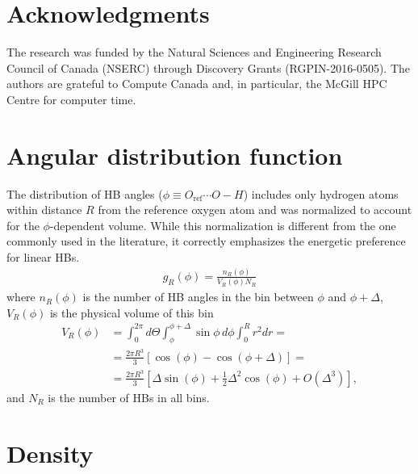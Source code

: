 \documentclass[10pt,amsmath,twocolumn,aps,prl,superscriptaddress,floatfix]{revtex4-1}
\newcommand{\bea}{\begin{eqnarray}}
\newcommand{\eea}{\end{eqnarray}}
\def\nn{\nonumber\\}
\begin{document}
\section{Acknowledgments} 

The research was funded by the Natural Sciences and Engineering Research Council of Canada (NSERC) through Discovery
Grants (RGPIN-2016-0505). The authors are grateful to Compute Canada and, in particular, the McGill HPC Centre for computer time.

\else %
\maketitle
\setcounter{figure}{0}
\renewcommand{\thefigure}{S\arabic{figure}}
\renewcommand{\thepage}{S\arabic{page}}
\section{Angular distribution function} 

The distribution of HB angles ($\phi \equiv O_{\text{ref}} \cdots O-H$) includes only hydrogen atoms within distance $R$ from the reference oxygen atom and was normalized to account for the $\phi$-dependent volume. While this normalization is different from the one commonly used in the literature, it correctly emphasizes the energetic preference for linear HBs.
%
\bea
g_R(\phi) = \frac{n_R(\phi)}{V_R(\phi) N_R}
\eea
%
where $n_R(\phi)$ is the number of HB angles in the bin between $\phi$ and $\phi + \Delta$, $V_R(\phi)$ is the physical volume of this bin
%
\bea
V_R(\phi) &= \int_0^{2 \pi} d\Theta \int_{\phi}^{\phi+\Delta} \sin \phi\, d\phi \int_0^R r^2 dr = \nn
&= \frac{2 \pi R^3}{3} \left[ \cos (\phi) -\cos (\phi+\Delta) \right] = \nn
&= \frac{2 \pi R^3}{3} \left[ \Delta \sin (\phi) + \frac{1}{2} \Delta^2 \cos (\phi) + O(\Delta^3)\right] , 
\eea
%
and $N_R$ is the number of HBs in all bins.

\section{Density} 
\end{document}
